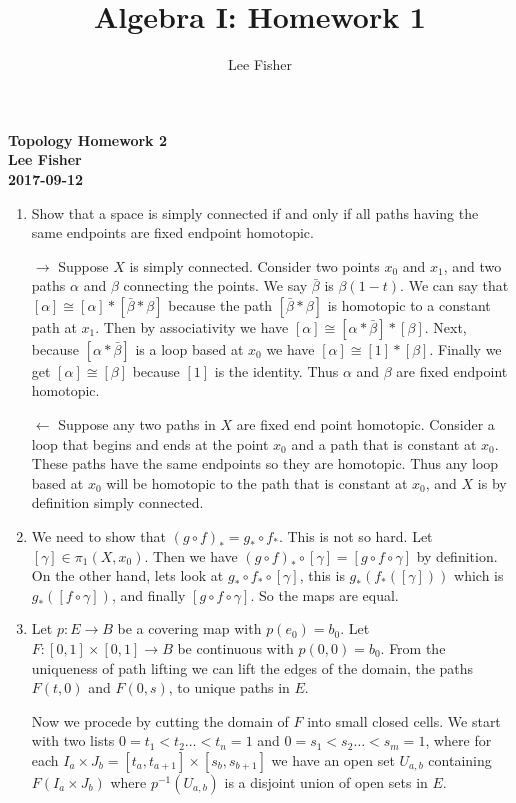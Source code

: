 \documentclass[12pt]{report}
\title{\textbf{Algebra I: Homework 1}}
\author{Lee Fisher}
\date{}
\begin{document}
\textbf{Topology Homework 2}\\
\indent \textbf{Lee Fisher}\\
\indent \textbf{2017-09-12}

\begin{enumerate}
\item Show that a space is simply connected if and only if all paths having the
same endpoints are fixed endpoint homotopic.

$\rightarrow$ Suppose $X$ is simply connected. Consider two points $x_0$ and
$x_1$, and two paths $\alpha$ and $\beta$ connecting the points. We say
$\bar{\beta}$ is $\beta(1-t)$. We can say that $[\alpha] \cong [\alpha] *
[\bar{\beta} * \beta]$ because the path $[\bar{\beta} * \beta]$ is homotopic to
a constant path at $x_1$. Then by associativity we have $[\alpha] \cong [\alpha
* \bar{\beta}] * [\beta]$. Next, because $[\alpha *\bar{\beta}]$ is a loop
based at $x_0$ we have $[\alpha] \cong [1] * [\beta]$. Finally we get $[\alpha]
\cong [\beta]$ because $[1]$ is the identity. Thus $\alpha$ and $\beta$ are
fixed endpoint homotopic.


$\leftarrow$ Suppose any two paths in $X$ are fixed end point homotopic.
Consider a loop that begins and ends at the point $x_0$ and a path that is
constant at $x_0$. These paths have the same endpoints so they are homotopic.
Thus any loop based at $x_0$ will be homotopic to the path that is constant at
$x_0$, and $X$ is by definition simply connected.

\item We need to show that $(g \circ f)_* = g_* \circ f_*$. This is not so
hard. Let $[\gamma] \in \pi_1(X,x_0)$. Then we have $(g \circ f)_* \circ
[\gamma] = [g \circ f \circ \gamma]$ by definition. On the other hand, lets
look at $g_* \circ f_* \circ [\gamma]$, this is $g_* ( f_*([\gamma]))$ which is
$g_*([f \circ \gamma])$, and finally $[g \circ f \circ \gamma]$. So the maps are
equal.

\item Let $p:E \to B$ be a covering map with $p(e_0) = b_0$. Let $F:[0,1]\times
[0,1] \to B$ be continuous with $p(0,0) = b_0$. From the uniqueness of path
lifting we can lift the edges of the domain, the paths $F(t,0)$ and $F(0,s)$, to
unique paths in $E$.

Now we procede by cutting the domain of $F$ into small closed cells. We start
with two lists $0=t_1 < t_2 \dots < t_n = 1$ and $0 = s_1 < s_2 \dots < s_m =1$,
where for each $I_a \times J_b = [t_a,t_{a+1}] \times [s_b,s_{b+1}]$ we have an
open set $U_{a,b}$ containing $F(I_a \times J_b)$ where $p^{-1}(U_{a,b})$ is a
disjoint union of open sets in $E$.


\end{enumerate}
\end{document}
